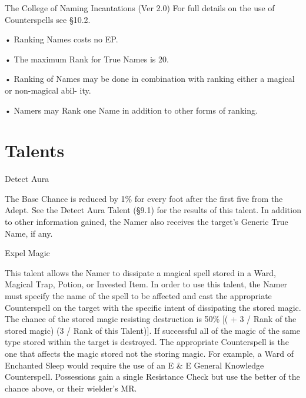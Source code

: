 \begin{Chapter}{The College of Naming Incantations (Ver 2.0)}
For  full  details  on  the  use  of  Counterspells  see 
§10.2. 

• Ranking Names costs no EP.  

• The maximum Rank for True Names is 20.  

•  Ranking  of  Names  may  be  done  in  combination 
with ranking either a magical or non-magical abil-
ity.  

• Namers may Rank one Name in addition to other 
forms of ranking. 


\section{Talents}

\begin{talent}[T-1]{Detect Aura}

\begin{effects}
The Base Chance is reduced by 1\% for every foot after the first five
from the Adept.  See the Detect Aura Talent (§9.1) for the results of
this talent.  In addition to other information gained, the Namer also
receives the target’s Generic True Name, if any.
\end{effects}
\end{talent}

\begin{talent}[T-2]{Expel Magic}

\begin{effects}
This talent allows the Namer to dissipate a magical spell stored in a
Ward, Magical Trap, Potion, or Invested Item. In order to use this
talent, the Namer must specify the name of the spell to be affected
and cast the appropriate Counterspell on the target with the specific
intent of dissipating the stored magic.  The chance of the stored
magic resisting destruction is 50\% [( + 3 / Rank of the stored magic)
  (3 / Rank of this Talent)]. If successful all of the magic of the
same type stored within the target is destroyed.  The appropriate
Counterspell is the one that affects the magic stored not the storing
magic.  For example, a Ward of Enchanted Sleep would require the use
of an E \& E General Knowledge Counterspell. Possessions gain a single
Resistance Check but use the better of the chance above, or their
wielder’s MR.
\end{effects}
\end{talent}


\end{Chapter}
